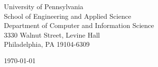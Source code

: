 \begin{minipage}{0.49\textwidth}
\begin{flushleft}
\noindent
University of Pennsylvania\\
School of Engineering and Applied Science\\
Department of Computer and Information Science\\
3330 Walnut Street, Levine Hall\\
Philadelphia, PA 19104-6309
\end{flushleft}
\end{minipage}
\begin{minipage}{0.47\textwidth}
\begin{flushright}
\today
\end{flushright}
\end{minipage} \\

\newcommand{\univ}{University of Pennsylvania}
\newcommand{\univshort}{UPenn}
\newcommand{\degree}{Ph.D.}
\newcommand{\dept}{Computer and Information Science}

